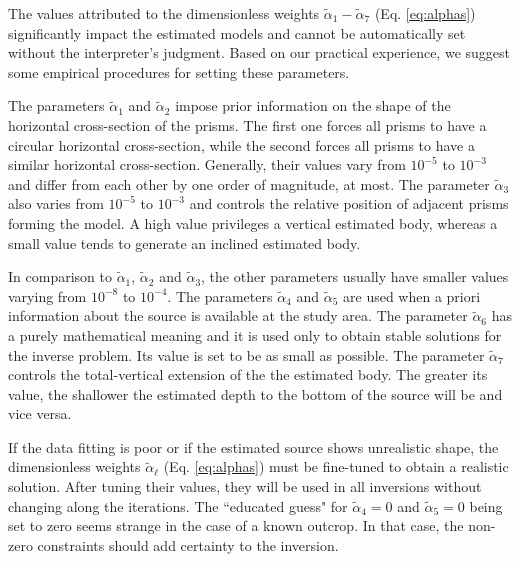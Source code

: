 
The values attributed to the dimensionless weights $\tilde{\alpha}_{1} - \tilde{\alpha}_{7}$ 
(Eq. \ref{eq:alphas}) significantly impact the estimated models and cannot be 
automatically set without the interpreter’s judgment. 
Based on our practical experience, we suggest some 
empirical procedures for setting these parameters.

The parameters $\tilde{\alpha}_1$ and $\tilde{\alpha}_2$ impose prior information 
on the shape of the horizontal cross-section of the prisms. 
The first one forces all prisms to have a circular horizontal cross-section, while 
the second forces all prisms to have a similar horizontal cross-section.
Generally, their values vary from $10^{-5}$ to $10^{-3}$ and differ from
each other by one order of magnitude, at most.
The parameter $\tilde{\alpha}_3$ also varies from $10^{-5}$ to $10^{-3}$ and 
controls the relative position of adjacent prisms forming the model.
A high value privileges a vertical estimated body, whereas a small value 
tends to generate an inclined estimated body.

In comparison to $\tilde{\alpha}_1$, $\tilde{\alpha}_2$ and $\tilde{\alpha}_3$,
the other parameters usually have smaller values varying from $10^{-8}$ to $10^{-4}$.
The parameters $\tilde{\alpha}_4$ and $\tilde{\alpha}_5$ are used when a priori
information about the source is available at the study area.
The parameter $\tilde{\alpha}_6$ has a purely mathematical meaning and it is 
used only to obtain stable solutions for the inverse problem.
Its value is set to be as small as possible.
The parameter $\tilde{\alpha}_7$ controls the total-vertical extension of the 
the estimated body. 
The greater its value, the shallower the estimated depth to the bottom of the source
will be and vice versa.

If the data fitting is poor or if the estimated source shows unrealistic shape,
the dimensionless weights $\tilde{\alpha}_{\ell}$ (Eq. \ref{eq:alphas}) must be
fine-tuned
to obtain a realistic solution. After tuning their values, they will be used in all
inversions without changing along the iterations. 
The ``educated guess" for $\tilde{\alpha}_4 = 0$ and $\tilde{\alpha}_5 = 0$ being set to zero seems strange in the case of a known outcrop. In that case, the non-zero constraints should add certainty to the inversion.
